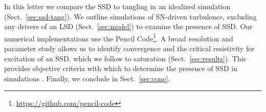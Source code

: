 \documentclass[preprint2]{aastex63}
\newcommand{\fg}[1]{\textcolor{midgreen}{#1}}
\begin{document}
In this letter we compare the SSD to tangling in an idealized simulation
(Sect.~\ref{sec:ssd-tang})\fg{.
We outline simulations of SN-driven turbulence, excluding any drivers of an LSD (Sect.~\ref{sec:model}) to examine the presence of SSD.} 
Our numerical implementations use the {\sc Pencil Code}\footnote{
\href{https://github.com/pencil-code}{https://github.com/pencil-code}}.
A broad resolution and parameter study allows us to identify \fg{convergence
and} the critical
resistivity for excitation of an SSD, \fg{which we follow} to 
saturation (Sect.~\ref{sec:results}).
This provides objective criteria with which to determine the presence of SSD
in simulations \citep[such as][]{Gent:2013b,GE20,SBADMN19}.
Finally, we conclude in Sect.~\ref{sec:conc}.
\end{document}
